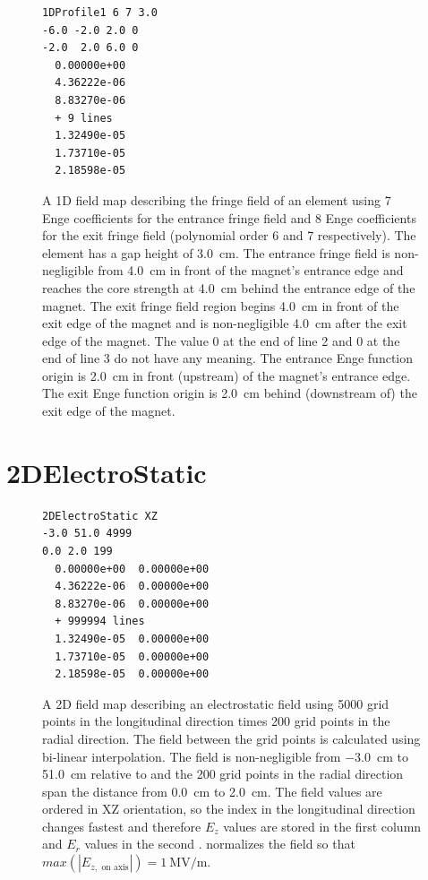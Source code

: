 \begin{figure}[h]
  \begin{fmpage}
\begin{verbatim}
1DProfile1 6 7 3.0
-6.0 -2.0 2.0 0
-2.0  2.0 6.0 0
  0.00000e+00
  4.36222e-06
  8.83270e-06
  + 9 lines
  1.32490e-05
  1.73710e-05
  2.18598e-05
\end{verbatim}
\end{fmpage}
\caption[Example of a 1DProfile1 Type 2 field map]{A 1D field map describing the fringe field of an element using 7 Enge coefficients for the entrance fringe field and 8 Enge coefficients for the exit fringe field (polynomial order 6 and 7 respectively). The element has a gap height of \SI{3.0}{\centi\meter}. The entrance fringe field is non-negligible from \SI{4.0}{\centi\meter} in front of the magnet's entrance edge and reaches the core strength at \SI{4.0}{\centi\meter} behind the entrance edge of the magnet. The exit fringe field region begins \SI{4.0}{\centi\meter} in front of the exit edge of the magnet and is non-negligible \SI{4.0}{\centi\meter} after the exit edge of the magnet. The value 0 at the end of line 2 and 0 at the end of line 3 do not have any meaning. The entrance Enge function origin is \SI{2.0}{\centi\meter} in front (upstream) of the magnet's entrance edge. The exit Enge function origin is \SI{2.0}{\centi\meter} behind (downstream of) the exit edge of the magnet.}
\label{fig:1DProfile1Type2}
\end{figure}



\section{2DElectroStatic}
\label{sec:2DElectroStatic}
\begin{figure}[h]
  \begin{fmpage}
\begin{verbatim}
2DElectroStatic XZ
-3.0 51.0 4999
0.0 2.0 199
  0.00000e+00  0.00000e+00
  4.36222e-06  0.00000e+00
  8.83270e-06  0.00000e+00
  + 999994 lines
  1.32490e-05  0.00000e+00
  1.73710e-05  0.00000e+00
  2.18598e-05  0.00000e+00
\end{verbatim}
  \end{fmpage}
  \caption[Example of a 2DElectroStatic field map]{A 2D field map describing an electrostatic field using 5000 grid points
    in the longitudinal direction times 200 grid points in the radial direction. The field between the grid points is calculated
    using bi-linear interpolation. The field is non-negligible from \SI{-3.0}{\centi\meter} to \SI{51.0}{\centi\meter} relative to  and the 200
    grid points in the radial direction span the distance from \SI{0.0}{\centi\meter} to \SI{2.0}{\centi\meter}. The field values are ordered in XZ
    orientation, so the index in the longitudinal direction changes fastest and therefore $E_z$ values are stored in the first
    column and $E_r$ values in the second . \opalt normalizes the field so that $max(|E_{z, \text{ on axis}}|) = \SI{1}{\mega\volt\per\meter}$.}
  \label{fig:2DElectroStatic}
\end{figure}

